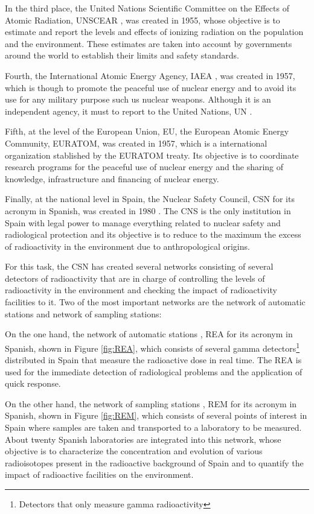 In the third place, the United Nations Scientific Committee on the Effects of Atomic Radiation, UNSCEAR \cite{UNSCEAR}, was created in 1955, whose objective is to estimate and report the levels and effects of ionizing radiation on the population and the environment. These estimates are taken into account by governments around the world to establish their limits and safety standards.

Fourth, the International Atomic Energy Agency, IAEA \cite{IAEA}, was created in 1957, which is though to promote the peaceful use of nuclear energy and to avoid its use for any military purpose such us nuclear weapons. Although it is an independent agency, it must to report to the United Nations, UN \cite{UN}.

Fifth, at the level of the European Union, EU, the European Atomic Energy Community, EURATOM, was created in 1957, which is a international organization stablished by the EURATOM treaty. Its objective is to coordinate research programs for the peaceful use of nuclear energy and the sharing of knowledge, infrastructure and financing of nuclear energy.

Finally, at the national level in Spain, the Nuclear Safety Council, CSN for its acronym in Spanish, was created in 1980 \cite{CSN}. The CNS is the only institution in Spain with legal power to manage everything related to nuclear safety and radiological protection and its objective is to reduce to the maximum the excess of radioactivity in the environment due to anthropological origins.

For this task, the CSN has created several networks consisting of several detectors of radioactivity that are in charge of controlling the levels of radioactivity in the environment and checking the impact of radioactivity facilities to it. Two of the most important networks are the network of automatic stations and network of sampling stations:

On the one hand, the network of automatic stations \cite{REA}, REA for its acronym in Spanish, shown in Figure \ref{fig:REA}, which consists of several gamma detectors\footnote{Detectors that only measure gamma radioactivity} distributed in Spain that measure the radioactive dose in real time. The REA is used for the immediate detection of radiological problems and the application of quick response.

On the other hand, the network of sampling stations \cite{REM}, REM for its acronym in Spanish, shown in Figure \ref{fig:REM}, which consists of several points of interest in Spain where samples are taken and transported to a laboratory to be measured. About twenty Spanish laboratories are integrated into this network, whose objective is to characterize the concentration and evolution of various radioisotopes present in the radioactive background of Spain and to quantify the impact of radioactive facilities on the environment.

